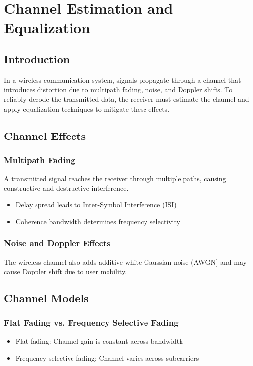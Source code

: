 
\chapter{Channel Estimation and Equalization}

\section{Introduction}
In a wireless communication system, signals propagate through a channel that introduces distortion due to multipath fading, noise, and Doppler shifts. To reliably decode the transmitted data, the receiver must estimate the channel and apply equalization techniques to mitigate these effects.

\section{Channel Effects}

\subsection{Multipath Fading}
A transmitted signal reaches the receiver through multiple paths, causing constructive and destructive interference.

\begin{itemize}
  \item Delay spread leads to Inter-Symbol Interference (ISI)
  \item Coherence bandwidth determines frequency selectivity
\end{itemize}

\subsection{Noise and Doppler Effects}
The wireless channel also adds additive white Gaussian noise (AWGN) and may cause Doppler shift due to user mobility.

\section{Channel Models}

\subsection{Flat Fading vs. Frequency Selective Fading}
\begin{itemize}
  \item Flat fading: Channel gain is constant across bandwidth
  \item Frequency selective fading: Channel varies across subcarriers
\end{itemize}

